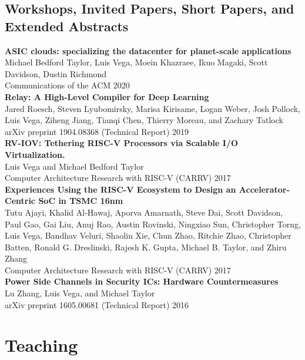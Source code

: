 \documentclass[10pt]{article}
\begin{document}
\subsection*{Workshops, Invited Papers, Short Papers, and Extended Abstracts}

\textbf{%
  ASIC clouds: specializing the datacenter for planet-scale applications
} \\
Michael Bedford Taylor, Luis Vega, Moein Khazraee, Ikuo Magaki,
Scott Davidson, Dustin Richmond \\
Communications of the ACM 2020 \\

\textbf{%
  Relay: A High-Level Compiler for Deep Learning
} \\
Jared Roesch, Steven Lyubomirsky, Marisa Kirisame, Logan Weber, Josh Pollock,
Luis Vega, Ziheng Jiang, Tianqi Chen, Thierry Moreau, and Zachary Tatlock \\
arXiv preprint 1904.08368 (Technical Report) 2019 \\ 

\textbf{%
  RV-IOV: Tethering RISC-V Processors via Scalable I/O Virtualization.
} \\
Luis Vega and Michael Bedford Taylor \\
Computer Architecture Research with RISC-V (CARRV) 2017 \\

\textbf{%
  Experiences Using the RISC-V Ecosystem to Design an Accelerator-Centric SoC in TSMC 16nm
} \\
Tutu Ajayi, Khalid Al-Hawaj, Aporva Amarnath, Steve Dai, Scott Davidson,
Paul Gao, Gai Liu, Anuj Rao, Austin Rovinski, Ningxiao Sun, Christopher Torng,
Luis Vega, Bandhav Veluri, Shaolin Xie, Chun Zhao, Ritchie Zhao, Christopher Batten,
Ronald G. Dreslinski, Rajesh K. Gupta, Michael B. Taylor, and Zhiru Zhang \\
Computer Architecture Research with RISC-V (CARRV) 2017 \\

\textbf{%
  Power Side Channels in Security ICs: Hardware Countermeasures
} \\
Lu Zhang, Luis Vega, and Michael Taylor \\
arXiv preprint 1605.00681 (Technical Report) 2016 \\ 

\section*{Teaching}
\end{document}
